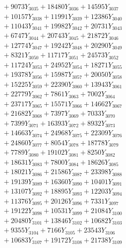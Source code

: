 \documentclass[a4paper,10pt]{article}
\begin{document}
{\begin{align}
&\;  + 9073 Y_{3035} + 18480 Y_{3036} + 14595 Y_{3037} \\[0.3ex]
&\;  + 10157 Y_{3038} + 11991 Y_{3039} + 12386 Y_{3040} \\[0.3ex]
&\;  + 11043 Y_{3041} + 19982 Y_{3042} + 20731 Y_{3043} \\[0.3ex]
&\;  + 6747 Y_{3044} + 20743 Y_{3045} + 21872 Y_{3046} \\[0.3ex]
&\;  + 12774 Y_{3047} + 19242 Y_{3048} + 20290 Y_{3049} \\[0.3ex]
&\;  + 8321 Y_{3050} + 11717 Y_{3051} + 24573 Y_{3052} \\[0.3ex]
&\;  + 11724 Y_{3053} + 24952 Y_{3054} + 18271 Y_{3055} \\[0.3ex]
&\;  + 19378 Y_{3056} + 15987 Y_{3057} + 20050 Y_{3058} \\[0.5ex]\allowbreak
&\;  + 15225 Y_{3059} + 22390 Y_{3060} + 13943 Y_{3061} \\[0.3ex]
&\;  + 22779 Y_{3062} + 7861 Y_{3063} + 7002 Y_{3064} \\[0.3ex]
&\;  + 23717 Y_{3065} + 15571 Y_{3066} + 14662 Y_{3067} \\[0.3ex]
&\;  + 21682 Y_{3068} + 7397 Y_{3069} + 7033 Y_{3070} \\[0.3ex]
&\;  + 7399 Y_{3071} + 16393 Y_{3072} + 8932 Y_{3073} \\[0.3ex]
&\;  + 14663 Y_{3074} + 24968 Y_{3075} + 22309 Y_{3076} \\[0.3ex]
&\;  + 24860 Y_{3077} + 8054 Y_{3078} + 18778 Y_{3079} \\[0.3ex]
&\;  + 7789 Y_{3080} + 19102 Y_{3081} + 8250 Y_{3082} \\[0.3ex]
&\;  + 18631 Y_{3083} + 7800 Y_{3084} + 18626 Y_{3085} \\[0.3ex]
&\;  + 18021 Y_{3086} + 21586 Y_{3087} + 23398 Y_{3088} \\[0.5ex]\allowbreak
&\;  + 19139 Y_{3089} + 16360 Y_{3090} + 10401 Y_{3091} \\[0.3ex]
&\;  + 13107 Y_{3092} + 18895 Y_{3093} + 12203 Y_{3094} \\[0.3ex]
&\;  + 11376 Y_{3095} + 20126 Y_{3096} + 7331 Y_{3097} \\[0.3ex]
&\;  + 19122 Y_{3098} + 10531 Y_{3099} + 21084 Y_{3100} \\[0.3ex]
&\;  + 20480 Y_{3101} + 13846 Y_{3102} + 10682 Y_{3103} \\[0.3ex]
&\;  + 9355 Y_{3104} + 7166 Y_{3105} + 23543 Y_{3106} \\[0.3ex]
&\;  + 10683 Y_{3107} + 19172 Y_{3108} + 21738 Y_{3109} \\[0.3ex]

\end{align}}
\end{document}
